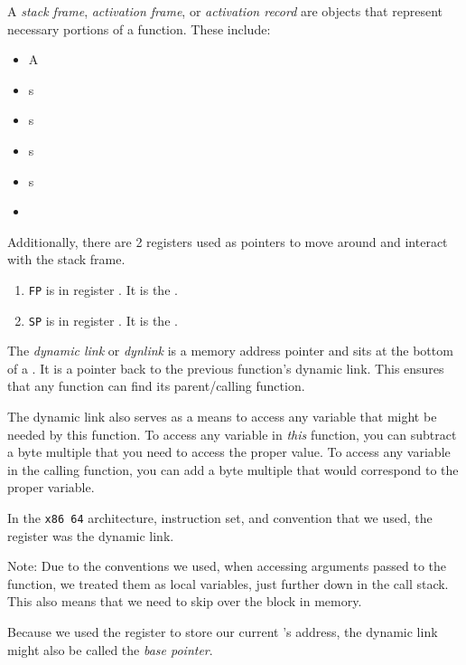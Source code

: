 \begin{definition}\label{def:Stack_Frame}
  A \emph{stack frame}, \emph{activation frame}, or \emph{activation record} are objects that represent necessary portions of a function.
  These include:
  \begin{itemize}[noitemsep]
  \item A 
  \item {}s
  \item {}s
  \item {}s
  \item {}s
  \item {}
  \end{itemize}

  Additionally, there are 2 registers used as pointers to move around and interact with the stack frame.
  \begin{enumerate}[noitemsep]
  \item \texttt{FP} is in register \rbp{}. It is the .
  \item \texttt{SP} is in register \rsp{}. It is the .
  \end{enumerate}
\end{definition}

\begin{definition}\label{def:Dynamic_Link}
  The \emph{dynamic link} or \emph{dynlink} is a memory address pointer and sits at the bottom of a .
  It is a pointer back to the previous function's dynamic link.
  This ensures that any function can find its parent/calling function.

  The dynamic link also serves as a means to access any variable that might be needed by this function.
  To access any variable in \emph{this} function, you can subtract a byte multiple that you need to access the proper value.
  To access any variable in the calling function, you can add a byte multiple that would correspond to the proper variable.

    In the \texttt{x86\textunderscore{} 64} architecture, instruction set, and convention that we used, the register \rbp{} was the dynamic link.
  \begin{remark}
    Note: Due to the conventions we used, when accessing arguments passed to the function, we treated them as local variables, just further down in the call stack.
    This also means that we need to skip over the  block in memory.
  \end{remark}
  
  \begin{remark}
    Because we used the \rbp{} register to store our current 's address, the dynamic link might also be called the \emph{base pointer}.
  \end{remark}
\end{definition}

